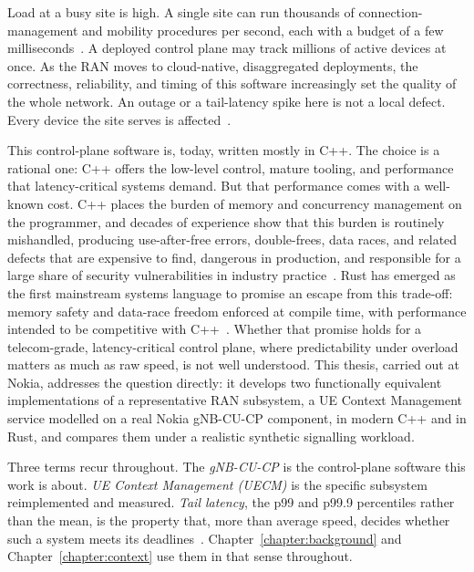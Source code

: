 \documentclass[english,twoside,openright,a4paper,censored,csm,software-track-2020]{HYthesisML}
\begin{document}
Load at a busy site is high. A single site can run thousands of connection-management and
mobility procedures per second, each with a budget of a few
milliseconds~\cite{3gpp38913}. A deployed control plane may track millions of active
devices at once. As the RAN moves to cloud-native, disaggregated deployments, the
correctness, reliability, and timing of this software increasingly set the quality of the
whole network. An outage or a tail-latency spike here is not a local defect. Every device
the site serves is affected~\cite{dean2013tail,barroso2017microseconds}.

This control-plane software is, today, written mostly in C++. The choice is a
rational one: C++ offers the low-level control, mature tooling, and performance that
latency-critical systems demand. But that performance comes with a well-known cost. C++
places the burden of memory and concurrency management on the programmer, and decades of
experience show that this burden is routinely mishandled, producing use-after-free errors,
double-frees, data races, and related defects that are expensive to find, dangerous in
production, and responsible for a large share of security vulnerabilities in industry
practice~\cite{msrc2019memory,google2022android}. Rust has emerged as the first mainstream
systems language to promise an escape from this trade-off: memory safety and data-race
freedom enforced at compile time, with performance intended to be competitive with
C++~\cite{klabnik2023rust,jung2018rustbelt}. Whether that promise holds for a
telecom-grade, latency-critical control plane, where predictability under overload matters
as much as raw speed, is not well understood. This thesis, carried out at Nokia, addresses
the question directly: it develops two functionally equivalent implementations of a
representative RAN subsystem, a UE Context Management service modelled on a real Nokia
gNB-CU-CP component, in modern C++ and in Rust, and compares them under a realistic
synthetic signalling workload.

Three terms recur throughout. The \emph{gNB-CU-CP} is the control-plane software this work is
about. \emph{UE Context Management (UECM)} is the specific subsystem reimplemented and measured.
\emph{Tail latency}, the p99 and p99.9 percentiles rather than the mean, is the property that,
more than average speed, decides whether such a system meets its
deadlines~\cite{dean2013tail,barroso2017microseconds}. Chapter~\ref{chapter:background} and Chapter~\ref{chapter:context} use them
in that sense throughout.
\end{document}
